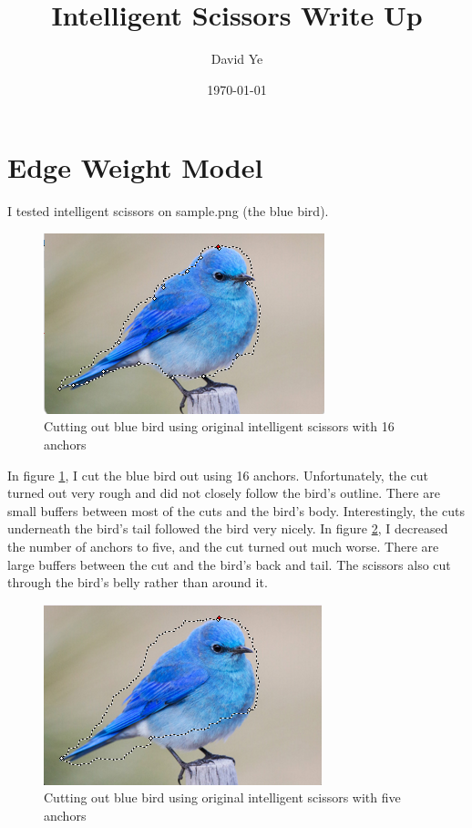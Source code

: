 \documentclass[11pt]{article}
\title{Intelligent Scissors Write Up}
\author{David Ye}
\date{\today}
\begin{document}
\maketitle
\section{Edge Weight Model}
I tested intelligent scissors on sample.png (the blue bird).

\begin{figure}[H]
	\centering
	\includegraphics{sample_bad.png}
	\caption{\label{fig:bird_16}Cutting out blue bird using original intelligent scissors with 16 anchors}
\end{figure}

In figure \ref{fig:bird_16}, I cut the blue bird out using 16 anchors. Unfortunately, the cut turned out very rough and did not closely follow the bird's outline. There are small buffers between most of the cuts and the bird's body. Interestingly, the cuts underneath the bird's tail followed the bird very nicely. In figure \ref{fig:bird_5}, I decreased the number of anchors to five, and the cut turned out much worse. There are large buffers between the cut and the bird's back and tail. The scissors also cut through the bird's belly rather than around it.

\begin{figure}[H]
	\centering
	\includegraphics{sample_bad_2.png}
	\caption{\label{fig:bird_5}Cutting out blue bird using original intelligent scissors with five anchors}
\end{figure}
\end{document}
